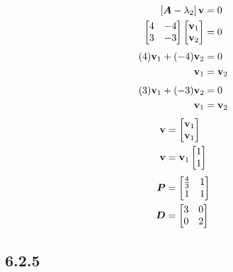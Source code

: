 \documentclass{article}
\begin{document}
\begin{align*}
	\left[ \matr{A} - \lambda_2 \right] \vect{v} & = 0 \\
	\begin{bmatrix}
		4 & -4 \\
		3 & -3 \\
	\end{bmatrix}
	\begin{bmatrix} \vect{v}_1 \\ \vect{v}_2 \end{bmatrix} & = 0
\end{align*}
\begin{align*}
	(4)\vect{v}_1 + (-4)\vect{v}_2 & = 0 \\
	\vect{v}_1 & = \vect{v}_2
\end{align*}
\begin{align*}
	(3)\vect{v}_1 + (-3)\vect{v}_2 & = 0 \\
	\vect{v}_1 & = \vect{v}_2
\end{align*}
\begin{align*}
	\vect{v} & = \begin{bmatrix} \vect{v}_1 \\ \vect{v}_1 \end{bmatrix} \\
	\vect{v} & = \vect{v}_1 \begin{bmatrix} 1 \\ 1 \end{bmatrix}
\end{align*}
\begin{align*}
	\bm{P} & =
		\begin{bmatrix}
			\frac{4}{3} & 1 \\
			1 & 1
		\end{bmatrix} \\
	\bm{D} & =
		\begin{bmatrix}
			3 & 0 \\
			0 & 2
		\end{bmatrix}
\end{align*}

\subsection{6.2.5}
\end{document}
